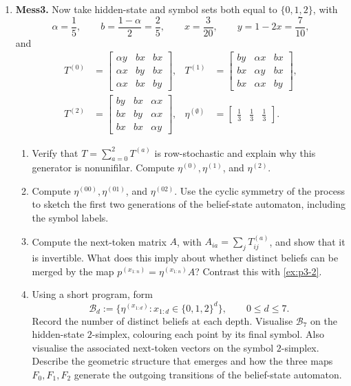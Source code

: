 \documentclass[11pt]{article}
\begin{document}
\begin{exercise}
\begin{enumerate}
    \item \textbf{Mess3.}
      Now take hidden-state and symbol sets both equal to $\{0,1,2\}$, with
      \[
        \alpha=\frac15,\qquad b=\frac{1-\alpha}{2}=\frac25,
        \qquad x=\frac3{20},\qquad y=1-2x=\frac7{10},
      \]
      and
      \[
        \begin{aligned}
          T^{(0)}&=
          \begin{bmatrix}
            \alpha y&bx&bx\\ \alpha x&by&bx\\ \alpha x&bx&by
          \end{bmatrix},&
          T^{(1)}&=
          \begin{bmatrix}
            by&\alpha x&bx\\ bx&\alpha y&bx\\ bx&\alpha x&by
          \end{bmatrix},\\[1mm]
          T^{(2)}&=
          \begin{bmatrix}
            by&bx&\alpha x\\ bx&by&\alpha x\\ bx&bx&\alpha y
          \end{bmatrix},&
          \eta^{(\emptyset)}&=
          \begin{bmatrix}\tfrac13&\tfrac13&\tfrac13\end{bmatrix}.
        \end{aligned}
      \]
      \begin{enumerate}
        \item Verify that $T=\sum_{a=0}^2T^{(a)}$ is row-stochastic and
          explain why this generator is nonunifilar. Compute
          $\eta^{(0)},\eta^{(1)}$, and $\eta^{(2)}$.

        \item Compute $\eta^{(00)},\eta^{(01)}$, and $\eta^{(02)}$. Use the
          cyclic symmetry of the process to sketch the first two generations
          of the belief-state automaton, including the symbol labels.

        \item Compute the next-token matrix $A$, with
          $A_{ia}=\sum_jT^{(a)}_{ij}$, and show that it is invertible. What
          does this imply about whether distinct beliefs can be merged by the
          map $p^{(x_{1:n})}=\eta^{(x_{1:n})}A$? Contrast this with \cref{ex:p3-2}.

        \item Using a short program, form
          \[
            \mathcal B_d:=
            \bigl\{\eta^{(x_{1:d})}:x_{1:d}\in\{0,1,2\}^d\bigr\},
            \qquad 0\leq d\leq7.
          \]
          Record the number of distinct beliefs at each depth. Visualise
          $\mathcal B_7$ on the hidden-state $2$-simplex, colouring each point
          by its final symbol. Also visualise the associated next-token
          vectors on the symbol $2$-simplex. Describe the geometric structure
          that emerges and how the three maps $F_0,F_1,F_2$ generate the
          outgoing transitions of the belief-state automaton.


\end{enumerate}
\end{enumerate}
\end{exercise}
\end{document}
